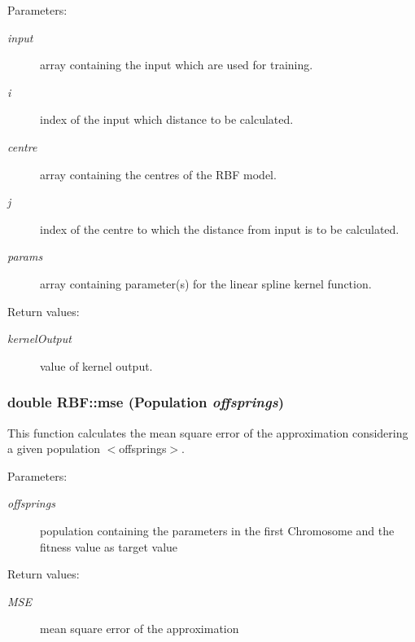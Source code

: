 \begin{Desc}
\item[Parameters:]
\begin{description}
\item[{\em input}]array containing the input which are used for training. \item[{\em i}]index of the input which distance to be calculated. \item[{\em centre}]array containing the centres of the RBF model. \item[{\em j}]index of the centre to which the distance from input is to be calculated. \item[{\em params}]array containing parameter(s) for the linear spline kernel function. \end{description}
\end{Desc}
\begin{Desc}
\item[Return values:]
\begin{description}
\item[{\em kernel\-Output}]value of kernel output.\end{description}
\end{Desc}
\subsubsection{\setlength{\rightskip}{0pt plus 5cm}double RBF::mse (Population {\em offsprings})}\label{classRBF_a11}


This function calculates the mean square error of the approximation considering a given population $<$offsprings$>$. 

\begin{Desc}
\item[Parameters:]
\begin{description}
\item[{\em offsprings}]population containing the parameters in the first Chromosome and the fitness value as target value \end{description}
\end{Desc}
\begin{Desc}
\item[Return values:]
\begin{description}
\item[{\em MSE}]mean square error of the approximation\end{description}
\end{Desc}
